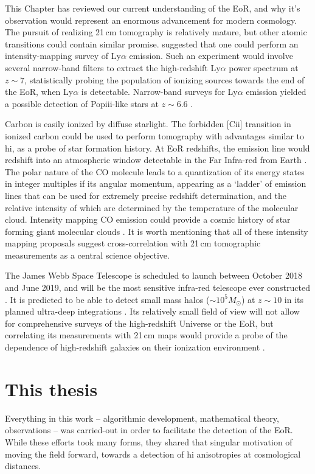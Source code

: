 This Chapter has reviewed our current understanding of the EoR, and why it's observation would represent an enormous advancement for modern cosmology. The pursuit of realizing 21\,cm tomography is relatively mature, but other atomic transitions could contain similar promise. \cite{Silva.13} suggested that one could perform an intensity-mapping survey of Ly$\alpha$ emission. Such an experiment would involve several narrow-band filters to extract the high-redshift Ly$\alpha$ power spectrum at $z\sim7$, statistically probing the population of ionizing sources towards the end of the EoR, when Ly$\alpha$ is detectable. Narrow-band surveys for Ly$\alpha$ emission yielded a possible detection of Pop{\sc iii}-like stars at $z\sim 6.6$ \citep{Sobral.15}.

Carbon is easily ionized by diffuse starlight. The forbidden [C{\sc ii}] transition in ionized carbon could be used to perform tomography with advantages similar to {\sc hi}, as a probe of star formation history. At EoR redshifts, the emission line would redshift into an atmospheric window detectable in the Far Infra-red from Earth \citep[e.g.][]{Gong.12, Hunacek.16, Pentericci.16}. 
The polar nature of the CO molecule leads to a quantization of its energy states in integer multiples if its angular momentum, appearing as a `ladder' of emission lines that can be used for extremely precise redshift determination, and the relative intensity of which are determined by the temperature of the molecular cloud. Intensity mapping CO emission could provide a cosmic history of star forming giant molecular clouds \citep[e.g.][]{Righi.08,Lidz,11.CO}.
It is worth mentioning that all of these intensity mapping proposals suggest cross-correlation with 21\,cm tomographic measurements as a central science objective.

The James Webb Space Telescope is scheduled to launch between October 2018 and June 2019, and will be the most sensitive infra-red telescope ever constructed \citep{jwst}. It is predicted to be able to detect small mass halos ($\sim 10^5 M_{\odot}$) at $z\sim 10$ in its planned ultra-deep integrations \citep{Salvaterra.11, Zackrisson.11}. Its relatively small field of view will not allow for comprehensive surveys of the high-redshift Universe or the EoR, but correlating its measurements with 21\,cm maps would provide a probe of the dependence of high-redshift galaxies on their ionization environment \citep[e.g.][]{Beardsley.15}.

\section{This thesis}
\label{sec:eor_intro_this_thesis}
Everything in this work -- algorithmic development, mathematical theory, observations -- was carried-out in order to facilitate the detection of the EoR. While these efforts took many forms, they shared that singular motivation of moving the field forward, towards a detection of {\sc hi} anisotropies at cosmological distances. 

